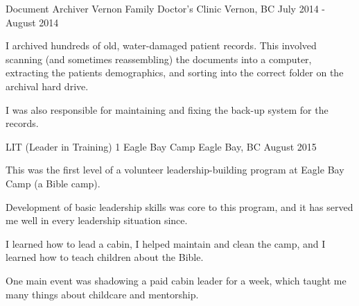 

\begin{cventries}

  \cventry
    {Document Archiver} %
    {Vernon Family Doctor's Clinic} %
    {Vernon, BC} %
    {July 2014 - August 2014} %
    {
      \begin{cvitems} %
        \item {I archived hundreds of old, water-damaged patient records. This involved scanning (and sometimes reassembling) the documents into a computer, extracting the patients demographics, and sorting into the correct folder on the archival hard drive.}
        \item {I was also responsible for maintaining and fixing the back-up system for the records.}
      \end{cvitems}
    }

  \cventry
    {LIT (Leader in Training) 1} %
    {Eagle Bay Camp} %
    {Eagle Bay, BC} %
    {August 2015} %
    {
      \begin{cvitems} %
        \item{This was the first level of a volunteer leadership-building program at Eagle Bay Camp (a Bible camp).}
        \item{Development of basic leadership skills was core to this program, and it has served me well in every leadership situation since.}
        \item{I learned how to lead a cabin, I helped maintain and clean the camp, and I learned how to teach children about the Bible.}
        \item{One main event was shadowing a paid cabin leader for a week, which taught me many things about childcare and mentorship.}
      \end{cvitems}
    }


\end{cventries}
